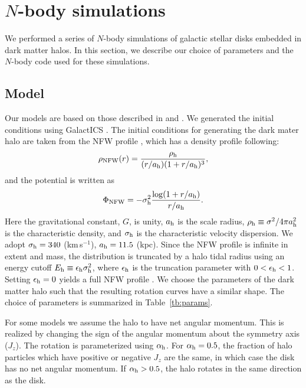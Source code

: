 
\section{$N$-body simulations}

We performed a series of $N$-body simulations of galactic stellar
disks embedded in dark matter halos. In this section, we describe our
choice of parameters and the $N$-body code used for these simulations.


\subsection{Model}
Our models are based on those described in \citet{2008ApJ...679.1239W} and 
\citet{2005ApJ...631..838W}. 
We generated the initial conditions using GalactICS \citep{2005ApJ...631..838W}.
The initial conditions for generating the dark mater halo are taken from the
NFW profile \citep{1997ApJ...490..493N}, which has a density profile following:
\begin{eqnarray}
\rho_{\rm NFW}(r) = \frac{\rho_{\rm h}}{(r/a_{\rm h})(1+r/a_{\rm h})^3},
\end{eqnarray}
and the potential is written as
\begin{eqnarray}
\Phi_{\rm NFW} = -\sigma_{\rm h}^2\frac{\log (1+r/a_{\rm h})}{r/a_{\rm h}}.
\end{eqnarray}
Here the gravitational constant, $G$, is unity, 
$a_{\rm h}$ is the scale radius, $\rho_{\rm h}\equiv\sigma^2/4\pi a_{\rm h}^2$
is the characteristic density, and $\sigma_{\rm h}$ is the characteristic 
velocity dispersion. We adopt $\sigma_{\rm h}=340$ (km\,s$^{-1}$), 
$a_{\rm h}=11.5$ (kpc).
Since the NFW profile is infinite in extent and mass, the 
distribution is truncated by a halo tidal radius using
an energy cutoff $E_{\rm h}\equiv\epsilon_{\rm h}\sigma_{\rm h}^2$,
where $\epsilon _{\rm h}$ is the truncation parameter with $0<\epsilon _{\rm h}<1$.
Setting $\epsilon _{\rm h}=0$ yields a full NFW profile
\citep[see][for details]{2005ApJ...631..838W}. 
We choose the parameters of the dark matter halo such that the resulting
rotation curves have a similar shape.
The choice of parameters is summarized in Table~\ref{tb:params}.

For some models we assume the halo to have net angular momentum. This
is realized by changing the sign of the angular momentum about the
symmetry axis ($J_{z}$). The rotation is parameterized using $\alpha
_{\rm h}$.  For $\alpha _{\rm h}=0.5$, the fraction of halo particles
which have positive or negative $J_{z}$ are the same, in which case the disk
has no net angular momentum. If $\alpha _{\rm h}>0.5$, the halo rotates in the same
direction as the disk.

